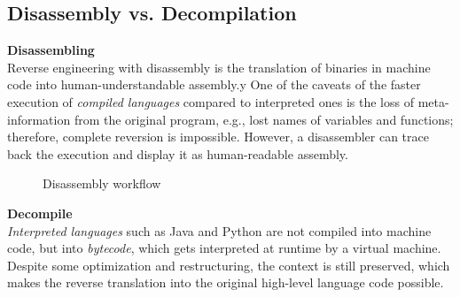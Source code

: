 \documentclass[seminar]{plai}
\begin{document}
\subsection{Disassembly vs. Decompilation}
\label{disassembly-vs-decompilation}

\textbf{Disassembling}\\
Reverse engineering with disassembly is the translation of binaries in machine code into human-understandable assembly.y
One of the caveats of the faster execution of \textit{compiled languages} compared to interpreted ones is the loss of meta-information from the original program, e.g., lost names of variables and functions; therefore, complete reversion is impossible.
However, a disassembler can trace back the execution and display it as human-readable assembly.\cite{reverse-engineering-vs-disassembly}\\

\begin{figure}[htbp]
\centering
{}
\caption{Disassembly workflow\cite{reverse-engineering-vs-disassembly}}
\label{fig:compile-disassemble}
\end{figure}

\noindent\textbf{Decompile}\\
\textit{Interpreted languages} such as Java and Python are not compiled into machine code, but into \textit{bytecode}, which gets interpreted at runtime by a virtual machine. Despite some optimization and restructuring, the context is still preserved, which makes the reverse translation into the original high-level language code possible.\cite{reverse-engineering-vs-disassembly}
\end{document}
